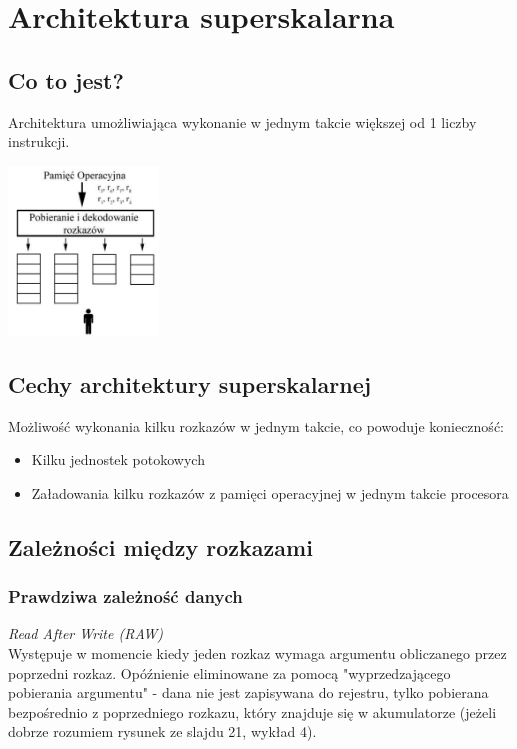 \section{Architektura superskalarna}
	\subsection{Co to jest?}
		Architektura umożliwiająca wykonanie w jednym takcie większej od 1 liczby instrukcji.
		\begin{center}
			\includegraphics[width=0.3\textwidth]{./images/superskalarna01}
		\end{center}
   	\subsection{Cechy architektury superskalarnej}
        Możliwość wykonania kilku rozkazów w jednym takcie, co powoduje konieczność:
		\begin{itemize}
          	\item Kilku jednostek potokowych
         	\item Załadowania kilku rozkazów z pamięci operacyjnej w jednym takcie procesora
		\end{itemize}
    \subsection{Zależności między rozkazami}
    	\subsubsection{Prawdziwa zależność danych} \label{subsubsec:RAW}
    		\emph{Read After Write (RAW)}\\
    		Występuje w momencie kiedy jeden rozkaz wymaga argumentu obliczanego przez poprzedni rozkaz. Opóźnienie eliminowane za pomocą "wyprzedzającego pobierania argumentu" - dana nie jest zapisywana do rejestru, tylko pobierana bezpośrednio z poprzedniego rozkazu, który znajduje się w akumulatorze (jeżeli dobrze rozumiem rysunek ze slajdu 21, wykład 4).
